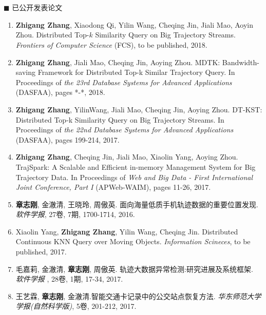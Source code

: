 \chapter*{}
{\heiti $\blacksquare$ 已公开发表论文}
	\vskip 5mm

\begin{enumerate}
	\renewcommand{\labelenumi}{[\theenumi]}
	\renewcommand\baselinestretch{1}\selectfont 	
	
	\item  \textbf{Zhigang Zhang}, Xiaodong Qi, Yilin Wang, Cheqing Jin, Jiali Mao, Aoyin Zhou. Distributed Top-$k$ Similarity Query on Big Trajectory Streams. \textit{Frontiers of Computer Science} (FCS), to be published, 2018.
	
	\item \textbf{Zhigang Zhang}, Jiali Mao, Cheqing Jin, Aoying Zhou. MDTK: Bandwidth-saving Framework for Distributed Top-k Similar Trajectory Query. In Proceedings of \textit{the 23rd Database Systems for Advanced Applications} (DASFAA), pages *-*, 2018.
	
	\item \textbf{Zhigang Zhang}, YilinWang, Jiali Mao, Cheqing Jin, Aoying Zhou. DT-KST: Distributed Top-k Similarity Query on Big
Trajectory Streams. In Proceedings of \textit{the 22nd Database Systems for Advanced Applications} (DASFAA), pages 199-214, 2017.
	
	\item \textbf{Zhigang Zhang}, Cheqing Jin, Jiali Mao, Xiaolin Yang, Aoying Zhou. TrajSpark: A Scalable and Efficient in-memory
Management System for Big Trajectory Data. In Proceedings of \textit{Web and Big Data - First International Joint Conference, Part {I}} (APWeb-WAIM), pages 11-26, 2017.
	
	\item \textbf{章志刚}, 金澈清, 王晓玲, 周傲英. 面向海量低质手机轨迹数据的重要位置发现.  \textit{软件学报},
	27卷, 7期, 1700-1714, 2016.
	
	\item  Xiaolin Yang, \textbf{Zhigang Zhang},  Yilin Wang, Cheqing Jin. Distributed Continuous KNN Query over Moving Objects. \textit{Information Scineces}, to be published, 2017.
	
	
	\item 毛嘉莉, 金澈清, \textbf{章志刚}, 周傲英. 轨迹大数据异常检测:研究进展及系统框架. \textit{软件学报} , 28卷, 1期, 17-34, 2017.
	
	\item 王艺霖, \textbf{章志刚}, 金澈清.智能交通卡记录中的公交站点恢复方法.  \textit{华东师范大学学报(自然科学版)}, 5卷, 201-212, 2017.
	

\end{enumerate}
